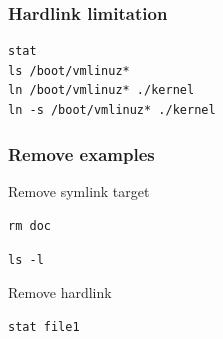 \begin{frame}[fragile]
	\frametitle{Hardlink limitation}
	\begin{lstlisting}
stat
ls /boot/vmlinuz*
ln /boot/vmlinuz* ./kernel
ln -s /boot/vmlinuz* ./kernel
	\end{lstlisting}
\end{frame}

\begin{frame}
	\frametitle{Remove examples}
	Remove symlink target 

	{\tt rm doc} 

	{\tt ls -l}

	Remove hardlink

	{\tt stat file1}
\end{frame}
